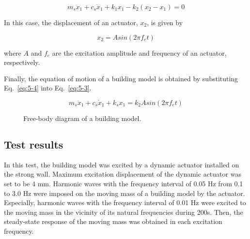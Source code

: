 \begin{equation}\label{eq:5-3}
m_{s}\ddot{x}_{1}+c_{s}\dot{x}_{1}+k_{1}x_{1}-k_{2}\left(x_{2}-x_{1}\right)=0
\end{equation}

In this case, the displacement of an actuator, $x_{2}$, is given by

\begin{equation}\label{eq:5-4}
x_{2}=A sin \left(2 \pi f_{e} t \right)
\end{equation}

where $A$ and $f_{e}$ are the excitation amplitude and frequency of an actuator, respectively.

Finally, the equation of motion of a building model is obtained by substituting Eq.~\eqref{eq:5-4} into Eq.~\eqref{eq:5-3}.

\begin{equation}\label{eq:5-5}
m_{s}\ddot{x}_{1}+c_{s}\dot{x}_{1}+k_{s}x_{1} = k_{2}A sin \left(2 \pi f_{e} t \right)
\end{equation}

\begin{figure}[!ht]
\centering
{}
\caption{Free-body diagram of a building model.}
\label{fig:5-5}
\end{figure}

\subsection{Test results}
In this test, the building model was excited by a dynamic actuator installed on the strong wall. Maximum excitation displacement of the dynamic actuator was set to be 4 mm. Harmonic waves with the frequency interval of 0.05 Hz from 0.1 to 3.0 Hz were imposed on the moving mass of a building model by the actuator. Especially, harmonic waves with the frequency interval of 0.01 Hz were excited to the moving mass in the vicinity of its natural frequencies during 200s. Then, the steady-state response of the moving mass was obtained in each excitation frequency.

